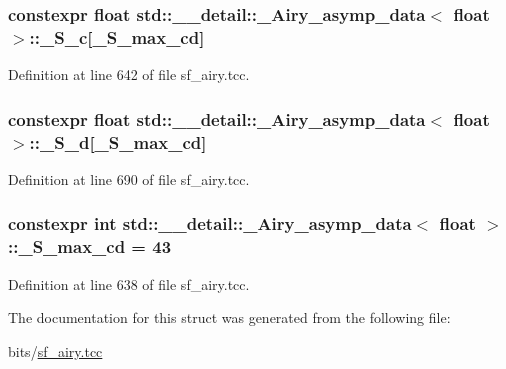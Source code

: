 \subsubsection[{\texorpdfstring{\+\_\+\+S\+\_\+c}{_S_c}}]{\setlength{\rightskip}{0pt plus 5cm}constexpr float {\bf std\+::\+\_\+\+\_\+detail\+::\+\_\+\+Airy\+\_\+asymp\+\_\+data}$<$ float $>$\+::\+\_\+\+S\+\_\+c\mbox{[}{\bf \+\_\+\+S\+\_\+max\+\_\+cd}\mbox{]}\hspace{0.3cm}{\ttfamily [static]}}\hypertarget{structstd_1_1____detail_1_1__Airy__asymp__data_3_01float_01_4_a8fc68acdbcbc59f4ecfdd4bc2f4f2a1e}{}\label{structstd_1_1____detail_1_1__Airy__asymp__data_3_01float_01_4_a8fc68acdbcbc59f4ecfdd4bc2f4f2a1e}


Definition at line 642 of file sf\+\_\+airy.\+tcc.

\subsubsection[{\texorpdfstring{\+\_\+\+S\+\_\+d}{_S_d}}]{\setlength{\rightskip}{0pt plus 5cm}constexpr float {\bf std\+::\+\_\+\+\_\+detail\+::\+\_\+\+Airy\+\_\+asymp\+\_\+data}$<$ float $>$\+::\+\_\+\+S\+\_\+d\mbox{[}{\bf \+\_\+\+S\+\_\+max\+\_\+cd}\mbox{]}\hspace{0.3cm}{\ttfamily [static]}}\hypertarget{structstd_1_1____detail_1_1__Airy__asymp__data_3_01float_01_4_ad947443d5860fcd25d25ad6d04ea3bb3}{}\label{structstd_1_1____detail_1_1__Airy__asymp__data_3_01float_01_4_ad947443d5860fcd25d25ad6d04ea3bb3}


Definition at line 690 of file sf\+\_\+airy.\+tcc.

\subsubsection[{\texorpdfstring{\+\_\+\+S\+\_\+max\+\_\+cd}{_S_max_cd}}]{\setlength{\rightskip}{0pt plus 5cm}constexpr int {\bf std\+::\+\_\+\+\_\+detail\+::\+\_\+\+Airy\+\_\+asymp\+\_\+data}$<$ float $>$\+::\+\_\+\+S\+\_\+max\+\_\+cd = 43\hspace{0.3cm}{\ttfamily [static]}}\hypertarget{structstd_1_1____detail_1_1__Airy__asymp__data_3_01float_01_4_ac0e59b83a90623587f20cdc32a9e7565}{}\label{structstd_1_1____detail_1_1__Airy__asymp__data_3_01float_01_4_ac0e59b83a90623587f20cdc32a9e7565}


Definition at line 638 of file sf\+\_\+airy.\+tcc.



The documentation for this struct was generated from the following file\+:\begin{DoxyCompactItemize}
\item 
bits/\hyperlink{sf__airy_8tcc}{sf\+\_\+airy.\+tcc}\end{DoxyCompactItemize}
